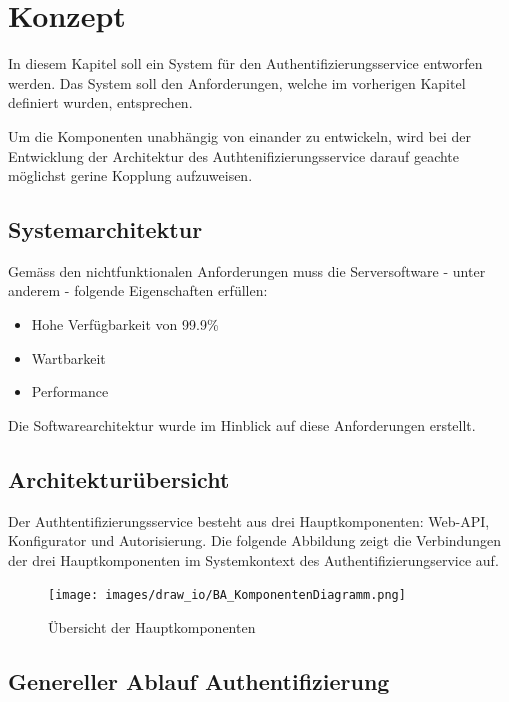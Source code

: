 \chapter{Konzept}\label{konzept}

In diesem Kapitel soll ein System für den Authentifizierungsservice
entworfen werden. Das System soll den Anforderungen, welche im
vorherigen Kapitel definiert wurden, entsprechen.

Um die Komponenten unabhängig von einander zu entwickeln, wird bei der
Entwicklung der Architektur des Authtenifizierungsservice darauf geachte
möglichst gerine Kopplung aufzuweisen.

\section{Systemarchitektur}\label{systemarchitektur}

Gemäss den nichtfunktionalen Anforderungen muss die Serversoftware -
unter anderem - folgende Eigenschaften erfüllen:

\begin{itemize}
\tightlist
\item
  Hohe Verfügbarkeit von 99.9\%
\item
  Wartbarkeit
\item
  Performance
\end{itemize}

Die Softwarearchitektur wurde im Hinblick auf diese Anforderungen
erstellt.

\newpage

\section{Architekturübersicht}\label{architekturuxfcbersicht}

Der Authtentifizierungsservice besteht aus drei Hauptkomponenten:
Web-API, Konfigurator und Autorisierung. Die folgende Abbildung zeigt
die Verbindungen der drei Hauptkomponenten im Systemkontext des
Authentifizierungservice auf.

\begin{figure}[htbp]
\centering
\texttt{[image: images/draw\_io/BA\_KomponentenDiagramm.png]}
\caption{Übersicht der Hauptkomponenten}
\end{figure}

\newpage

\section{Genereller Ablauf
Authentifizierung}\label{genereller-ablauf-authentifizierung}


